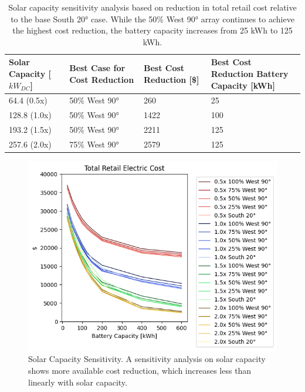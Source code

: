 \documentclass[journal,article,submit,pdftex,moreauthors]{Definitions/mdpi}
\begin{document}
\begin{table}[!h]
  \centering
  \caption{Solar capacity sensitivity analysis based on reduction in total retail cost relative to the base South 20° case. While the 50\% West 90° array continues to achieve the highest cost reduction, the battery capacity increases from 25 kWh to 125 kWh.}
  \label{tab:solar-sensitivity}
  \begin{tabularx}{\textwidth}{XXXX}
    \toprule
    Solar Capacity {[}\(kW_{DC}\){]} & Best Case for Cost Reduction         & Best
    Cost Reduction {[}\${]}          & Best Cost Reduction Battery Capacity
    {[}kWh{]}                                                                            \\
    \midrule
    64.4 (0.5x)                      & 50\% West 90°                        & 260  & 25  \\
    128.8 (1.0x)                     & 50\% West 90°                        & 1422 & 100 \\
    193.2 (1.5x)                     & 50\% West 90°                        & 2211 & 125 \\
    257.6 (2.0x)                     & 75\% West 90°                        & 2579 & 125 \\
    \bottomrule
  \end{tabularx}
\end{table}


\begin{figure}
  \centering
  \includegraphics[width=0.8\linewidth]{./images/total cost reduction solar sensitivity.png}
  \caption{Solar Capacity Sensitivity. A sensitivity analysis on solar capacity shows more available cost reduction, which increases less than linearly with solar capacity.}
  \label{fig:solar-sensitivity}
\end{figure}
\end{document}
